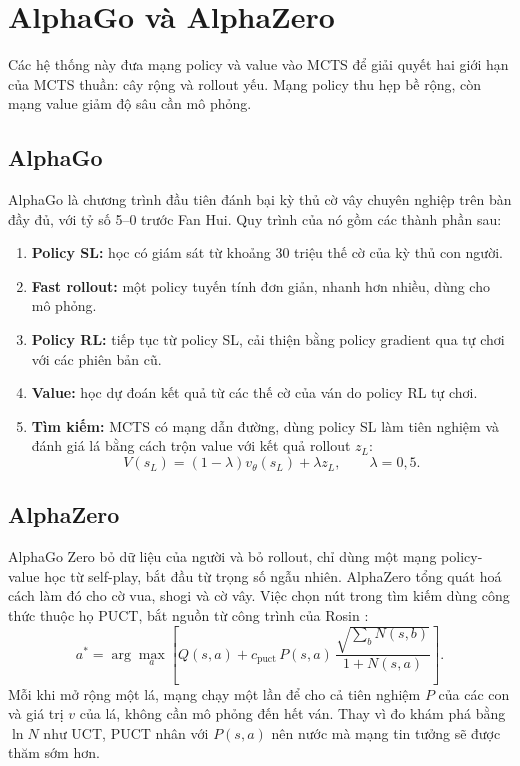 \section{AlphaGo và AlphaZero}
\label{sec:lt-alpha}
Các hệ thống này đưa mạng policy và value vào MCTS để giải quyết hai giới hạn của MCTS thuần: cây rộng và rollout yếu. Mạng policy thu hẹp bề rộng, còn mạng value giảm độ sâu cần mô phỏng.

\subsection{AlphaGo}
\label{sec:lt-alphago}
AlphaGo \cite{silver2016alphago} là chương trình đầu tiên đánh bại kỳ thủ cờ vây chuyên nghiệp trên bàn đầy đủ, với tỷ số 5--0 trước Fan Hui. Quy trình của nó gồm các thành phần sau:
\begin{enumerate}
  \item \textbf{Policy SL:} học có giám sát từ khoảng 30 triệu thế cờ của kỳ thủ con người.
  \item \textbf{Fast rollout:} một policy tuyến tính đơn giản, nhanh hơn nhiều, dùng cho mô phỏng.
  \item \textbf{Policy RL:} tiếp tục từ policy SL, cải thiện bằng policy gradient qua tự chơi với các phiên bản cũ.
  \item \textbf{Value:} học dự đoán kết quả từ các thế cờ của ván do policy RL tự chơi.
  \item \textbf{Tìm kiếm:} MCTS có mạng dẫn đường, dùng policy SL làm tiên nghiệm và đánh giá lá bằng cách trộn value với kết quả rollout $z_L$:
  \begin{equation}
    V(s_L) = (1 - \lambda) v_\theta(s_L) + \lambda z_L, \qquad \lambda = 0{,}5.
    \label{eq:tron-la}
  \end{equation}
\end{enumerate}

\subsection{AlphaZero}
\label{sec:lt-alphazero}
AlphaGo Zero \cite{silver2017alphagozero} bỏ dữ liệu của người và bỏ rollout, chỉ dùng một mạng policy-value học từ self-play, bắt đầu từ trọng số ngẫu nhiên. AlphaZero \cite{silver2018alphazero} tổng quát hoá cách làm đó cho cờ vua, shogi và cờ vây. Việc chọn nút trong tìm kiếm dùng công thức thuộc họ PUCT, bắt nguồn từ công trình của Rosin \cite{rosin2011puct}:
\begin{equation}
  a^* = \arg\max_a \left[ Q(s, a) + c_{\text{puct}} \, P(s, a) \, \frac{\sqrt{\sum_b N(s, b)}}{1 + N(s, a)} \right].
  \label{eq:puct}
\end{equation}
Mỗi khi mở rộng một lá, mạng chạy một lần để cho cả tiên nghiệm $P$ của các con và giá trị $v$ của lá, không cần mô phỏng đến hết ván. Thay vì đo khám phá bằng $\ln N$ như UCT, PUCT nhân với $P(s, a)$ nên nước mà mạng tin tưởng sẽ được thăm sớm hơn.

